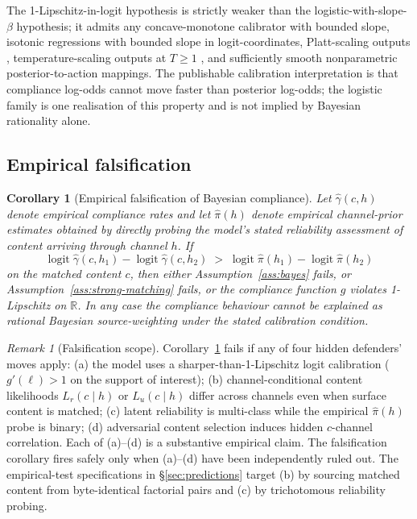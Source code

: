 \documentclass[11pt]{article}
\newtheorem{corollary}{Corollary}
\theoremstyle{definition}
\theoremstyle{remark}
\newtheorem{remark}{Remark}
\begin{document}
The 1-Lipschitz-in-logit hypothesis is strictly weaker than the logistic-with-slope-$\beta$
hypothesis; it admits any concave-monotone calibrator with bounded slope, isotonic
regressions with bounded slope in logit-coordinates, Platt-scaling outputs
\cite{spiess2024calibration}, temperature-scaling outputs at $T \ge 1$
\cite{lamb2025semantic}, and sufficiently smooth nonparametric posterior-to-action
mappings. The publishable calibration interpretation is that compliance log-odds
cannot move faster than posterior log-odds; the logistic family is one realisation
of this property and is not implied by Bayesian rationality alone.

\subsection{Empirical falsification}

\begin{corollary}[Empirical falsification of Bayesian compliance]
\label{cor:falsification}
Let $\hat{\gamma}(c, h)$ denote empirical compliance rates and let $\hat{\pi}(h)$
denote empirical channel-prior estimates obtained by directly probing the model's
stated reliability assessment of content arriving through channel $h$. If
\[
\operatorname{logit} \hat{\gamma}(c, h_1) - \operatorname{logit} \hat{\gamma}(c, h_2)
\;>\;
\operatorname{logit} \hat{\pi}(h_1) - \operatorname{logit} \hat{\pi}(h_2)
\]
on the matched content $c$, then either Assumption~\ref{ass:bayes} fails, or
Assumption~\ref{ass:strong-matching} fails, or the compliance function $g$ violates
1-Lipschitz on $\mathbb{R}$. In any case the compliance behaviour cannot be explained
as rational Bayesian source-weighting under the stated calibration condition.
\end{corollary}

\begin{remark}[Falsification scope]
\label{rem:falsification-scope}
Corollary~\ref{cor:falsification} fails if any of four hidden defenders' moves apply:
(a) the model uses a sharper-than-1-Lipschitz logit calibration ($g'(\ell) > 1$ on the
support of interest); (b) channel-conditional content likelihoods $L_r(c \mid h)$ or
$L_u(c \mid h)$ differ across channels even when surface content is matched; (c)
latent reliability is multi-class while the empirical $\hat\pi(h)$ probe is binary;
(d) adversarial content selection induces hidden $c$-channel correlation. Each of
(a)--(d) is a substantive empirical claim. The falsification corollary fires safely
only when (a)--(d) have been independently ruled out. The empirical-test specifications
in \S\ref{sec:predictions} target (b) by sourcing matched content from byte-identical
factorial pairs and (c) by trichotomous reliability probing.
\end{remark}
\end{document}

